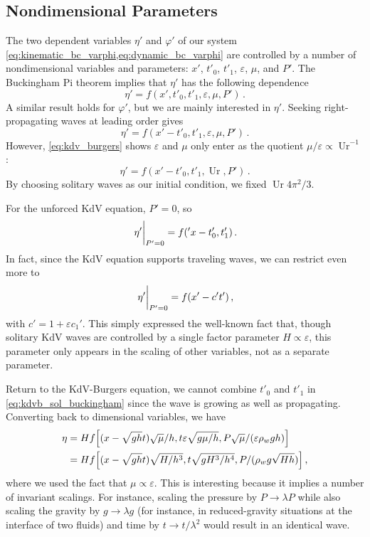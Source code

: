 \documentclass{jfm}
\DeclareMathOperator{\Ur}{Ur}
\renewcommand*{\epsilon}{\varepsilon}
\begin{document}
\subsection{Nondimensional Parameters}
The two dependent variables $\eta'$ and $\varphi'$ of our system
\cref{eq:kinematic_bc_varphi,eq:dynamic_bc_varphi} are controlled by a
number of nondimensional variables and parameters: $x'$, $t'_0$, $t'_1$,
$\epsilon$, $\mu$, and $P'$.
The Buckingham Pi theorem implies that $\eta'$ has the following
dependence
\begin{equation}
  \eta' = f(x', t'_0, t'_1, \epsilon, \mu, P') \,.
\end{equation}
A similar result holds for $\varphi'$, but we are mainly interested in
$\eta'$.
Seeking right-propagating waves at leading order gives
\begin{equation}
  \eta' = f(x'-t'_0, t'_1, \epsilon, \mu, P') \,.
\end{equation}
However, \cref{eq:kdv_burgers} shows $\epsilon$ and $\mu$ only enter as
the quotient $\mu/\epsilon \propto \Ur^{-1}$:
\begin{equation}
  \eta' = f(x'-t'_0, t'_1, \Ur, P') \,.
  \label{eq:kdvb_sol_buckingham}
\end{equation}
By choosing solitary waves as our initial condition, we fixed $\Ur
4\pi^2/3$.

For the unforced KdV equation, $P'=0$, so
\begin{equation}
  \eval{\eta'}_{P'=0} = f('x - t'_0, t'_1) \,.
\end{equation}
In fact, since the KdV equation supports traveling waves, we can
restrict even more to
\begin{equation}
  \eval{\eta'}_{P'=0} = f(x'-c' t') \,,
\end{equation}
with $c' = 1 + \epsilon c_1'$.
This simply expressed the well-known fact that, though solitary KdV
waves are controlled by a single factor parameter $H \propto \epsilon$,
this parameter only appears in the scaling of other variables, \ie not
as a separate parameter.

Return to the KdV-Burgers equation, we cannot combine $t'_0$ and $t'_1$
in \cref{eq:kdvb_sol_buckingham} since the wave is growing as well as
propagating.
Converting back to dimensional variables, we have
\begin{equation}
  \begin{split}
    \eta &= H f\bqty{(x - \sqrt{gh} t) \sqrt{\mu}/h, t \epsilon \sqrt{g
      \mu/h}, P \sqrt{\mu}/(\epsilon \rho_w g h)} \\
    &= H f\bqty{(x - \sqrt{gh}t) \sqrt{H/h^3}, t \sqrt{g H^3/h^4}, P /(\rho_w
      g \sqrt{H h})} \,,
  \end{split}
\end{equation}
where we used the fact that $\mu \propto \epsilon$.
This is interesting because it implies a number of invariant scalings.
For instance, scaling the pressure by $P \to \lambda P$ while also
scaling the gravity by $g \to \lambda g$ (for instance, in
reduced-gravity situations at the interface of two fluids) and time by
$t \to t/\lambda^2$ would result in an identical wave.
\end{document}
